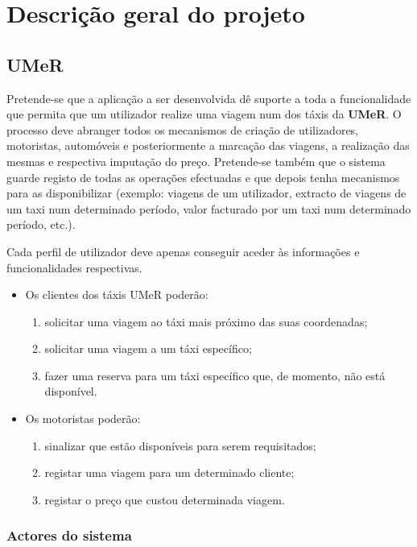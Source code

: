 \chapter{Descrição geral do projeto}
\section{UMeR}
Pretende-se que a aplicação a ser desenvolvida dê suporte a toda a funcionalidade que permita que um utilizador realize uma viagem num dos táxis da \textbf{UMeR}. O processo deve abranger todos os mecanismos de criação de utilizadores, motoristas, automóveis e posteriormente a marcação das viagens, a realização das mesmas e respectiva imputação do preço. Pretende-se também que o sistema guarde registo de todas as operações efectuadas e que depois tenha mecanismos para as disponibilizar (exemplo: viagens de um utilizador, extracto de viagens de um taxi num determinado período, valor facturado por um taxi num determinado período, etc.). 

Cada perfil de utilizador deve apenas conseguir aceder às informações e funcionalidades respectivas.

\begin{itemize}
	\item Os clientes dos táxis UMeR poderão:
	\begin{enumerate}
		\item solicitar uma viagem ao táxi mais próximo das suas coordenadas;
		\item solicitar uma viagem a um táxi específico;
		\item fazer uma reserva para um táxi específico que, de momento, não está disponível.
	\end{enumerate}
\end{itemize}

\begin{itemize}
	\item Os motoristas poderão:
	\begin{enumerate}
		\item sinalizar que estão disponíveis para serem requisitados;
		\item registar uma viagem para um determinado cliente;
		\item registar o preço que custou determinada viagem.
	\end{enumerate}
\end{itemize}

\subsection{Actores do sistema}

